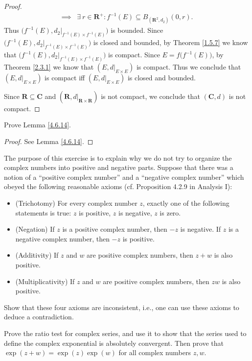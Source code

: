 \begin{proof}
\begin{align*}
        \implies & \exists\ r \in \mathbf{R}^+ : f^{-1}(E) \subseteq B_{(\mathbf{R}^2, d_2)}(0, r).
    \end{align*}
    Thus \(\big(f^{-1}(E), d_2|_{f^{-1}(E) \times f^{-1}(E)}\big)\) is bounded.
    Since \(\big(f^{-1}(E), d_2|_{f^{-1}(E) \times f^{-1}(E)}\big)\) is closed and bounded, by Theorem \ref{1.5.7} we know that \(\big(f^{-1}(E), d_2|_{f^{-1}(E) \times f^{-1}(E)}\big)\) is compact.
    Since \(E = f\big(f^{-1}(E)\big)\), by Theorem \ref{2.3.1} we know that \((E, d|_{E \times E})\) is compact.
    Thus we conclude that \((E, d|_{E \times E})\) is compact iff \((E, d|_{E \times E})\) is closed and bounded.

    Since \(\mathbf{R} \subseteq \mathbf{C}\) and \((\mathbf{R}, d|_{\mathbf{R} \times \mathbf{R}})\) is not compact, we conclude that \((\mathbf{C}, d)\) is not compact.
\end{proof}

\begin{exercise}\label{ex 4.6.14}
    Prove Lemma \ref{4.6.14}.
\end{exercise}

\begin{proof}
    See Lemma \ref{4.6.14}.
\end{proof}

\begin{exercise}\label{ex 4.6.15}
    The purpose of this exercise is to explain why we do not try to organize the complex numbers into positive and negative parts.
    Suppose that there was a notion of a ``positive complex number'' and a ``negative complex number'' which obeyed the following reasonable axioms (cf. Proposition 4.2.9 in Analysis I):
    \begin{itemize}
        \item (Trichotomy)
              For every complex number \(z\), exactly one of the following statements is true:
              \(z\) is positive, \(z\) is negative, \(z\) is zero.
        \item (Negation)
              If \(z\) is a positive complex number, then \(-z\) is negative.
              If \(z\) is a negative complex number, then \(-z\) is positive.
        \item (Additivity)
              If \(z\) and \(w\) are positive complex numbers, then \(z + w\) is also positive.
        \item (Multiplicativity)
              If \(z\) and \(w\) are positive complex numbers, then \(zw\) is also positive.
    \end{itemize}
    Show that these four axioms are inconsistent, i.e., one can use these axioms to deduce a contradiction.
\end{exercise}

\begin{exercise}\label{ex 4.6.16}
    Prove the ratio test for complex series, and use it to show that the series used to define the complex exponential is absolutely convergent.
    Then prove that \(\exp(z + w) = \exp(z) \exp(w)\) for all complex numbers \(z, w\).
\end{exercise}